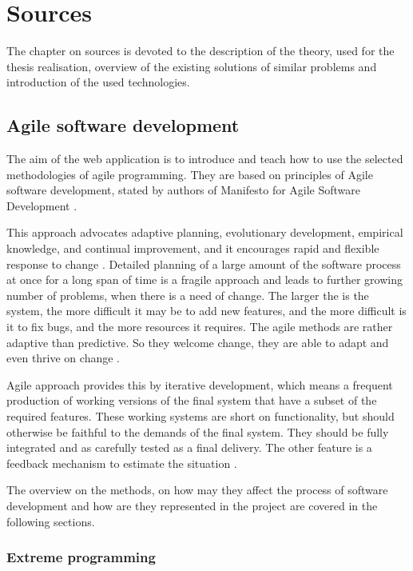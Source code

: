 \chapter{Sources}
\label{ch:sources}
The chapter on sources is devoted to the description of the theory, used for the thesis realisation, overview of the existing solutions of similar problems and introduction of the used technologies.

\section{Agile software development}
The aim of the web application is to introduce and teach how to use the selected methodologies of agile programming. They are based on principles of Agile software development, stated by authors of Manifesto for Agile Software Development \cite{manifesto}.

This approach advocates adaptive planning, evolutionary development, empirical knowledge, and continual improvement, and it encourages rapid and flexible response to change \cite{swdev}. Detailed planning of a large amount of the software process at once for a long span of time is a fragile approach and leads to further growing number of problems, when there is a need of change. The larger the is the system, the more difficult it may be to add new features, and the more difficult is it to fix bugs, and the more resources it requires. The agile methods are rather adaptive than predictive. So they welcome change, they are able to adapt and even thrive on change \cite[From Nothing, to Monumental, to Agile]{agile_fowler}. 

Agile approach provides this by iterative development, which means a frequent production of working versions of the final system that have a subset of the required features. These working systems are short on functionality, but should otherwise be faithful to the demands of the final system. They should be fully integrated and as carefully tested as a final delivery. The other feature is a feedback mechanism to estimate the situation \cite[Controlling an Unpredictable Process - Iterations]{agile_fowler}. 

The overview on the methods, on how may they affect the process of software development and how are they represented in the project are covered in the following sections.

\subsection{Extreme programming}

